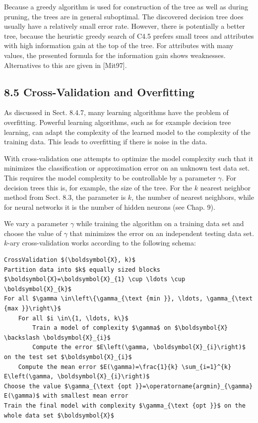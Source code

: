 \documentclass[10pt]{article}
\begin{document}
Because a greedy algorithm is used for construction of the tree as well as during pruning, the trees are in general suboptimal. The discovered decision tree does usually have a relatively small error rate. However, there is potentially a better tree, because the heuristic greedy search of C4.5 prefers small trees and attributes with high information gain at the top of the tree. For attributes with many values, the presented formula for the information gain shows weaknesses. Alternatives to this are given in [Mit97].

\subsection*{8.5 Cross-Validation and Overfitting}
As discussed in Sect. 8.4.7, many learning algorithms have the problem of overfitting. Powerful learning algorithms, such as for example decision tree learning, can adapt the complexity of the learned model to the complexity of the training data. This leads to overfitting if there is noise in the data.

With cross-validation one attempts to optimize the model complexity such that it minimizes the classification or approximation error on an unknown test data set. This requires the model complexity to be controllable by a parameter $\gamma$. For decision trees this is, for example, the size of the tree. For the $k$ nearest neighbor method from Sect. 8.3, the parameter is $k$, the number of nearest neighbors, while for neural networks it is the number of hidden neurons (see Chap. 9).

We vary a parameter $\gamma$ while training the algorithm on a training data set and choose the value of $\gamma$ that minimizes the error on an independent testing data set. $k$-ary cross-validation works according to the following schema:

\begin{verbatim}
CrossValidation $(\boldsymbol{X}, k)$
Partition data into $k$ equally sized blocks $\boldsymbol{X}=\boldsymbol{X}_{1} \cup \ldots \cup \boldsymbol{X}_{k}$
For all $\gamma \in\left\{\gamma_{\text {min }}, \ldots, \gamma_{\text {max }}\right\}$
    For all $i \in\{1, \ldots, k\}$
        Train a model of complexity $\gamma$ on $\boldsymbol{X} \backslash \boldsymbol{X}_{i}$
        Compute the error $E\left(\gamma, \boldsymbol{X}_{i}\right)$ on the test set $\boldsymbol{X}_{i}$
    Compute the mean error $E(\gamma)=\frac{1}{k} \sum_{i=1}^{k} E\left(\gamma, \boldsymbol{X}_{i}\right)$
Choose the value $\gamma_{\text {opt }}=\operatorname{argmin}_{\gamma} E(\gamma)$ with smallest mean error
Train the final model with complexity $\gamma_{\text {opt }}$ on the whole data set $\boldsymbol{X}$
\end{verbatim}
\end{document}
